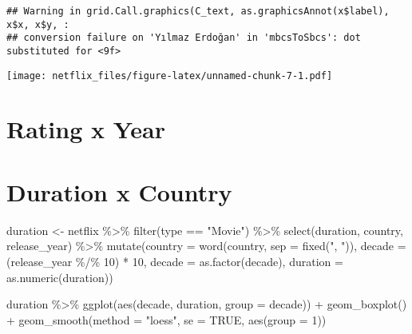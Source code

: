 \documentclass[
]{article}
\newenvironment{Shaded}{\begin{snugshade}}{\end{snugshade}}
\newcommand{\AttributeTok}[1]{\textcolor[rgb]{0.77,0.63,0.00}{#1}}
\newcommand{\ConstantTok}[1]{\textcolor[rgb]{0.00,0.00,0.00}{#1}}
\newcommand{\DecValTok}[1]{\textcolor[rgb]{0.00,0.00,0.81}{#1}}
\newcommand{\FunctionTok}[1]{\textcolor[rgb]{0.00,0.00,0.00}{#1}}
\newcommand{\NormalTok}[1]{#1}
\newcommand{\OtherTok}[1]{\textcolor[rgb]{0.56,0.35,0.01}{#1}}
\newcommand{\SpecialCharTok}[1]{\textcolor[rgb]{0.00,0.00,0.00}{#1}}
\newcommand{\StringTok}[1]{\textcolor[rgb]{0.31,0.60,0.02}{#1}}
\begin{document}
\begin{verbatim}
## Warning in grid.Call.graphics(C_text, as.graphicsAnnot(x$label), x$x, x$y, :
## conversion failure on 'Yılmaz Erdoğan' in 'mbcsToSbcs': dot substituted for <9f>
\end{verbatim}

\texttt{[image: netflix\_files/figure-latex/unnamed-chunk-7-1.pdf]}

\hypertarget{rating-x-year}{%
\section{Rating x Year}\label{rating-x-year}}

\hypertarget{duration-x-country}{%
\section{Duration x Country}\label{duration-x-country}}

\begin{Shaded}
\begin{Highlighting}[]
\NormalTok{duration }\OtherTok{\textless{}{-}}\NormalTok{ netflix }\SpecialCharTok{\%\textgreater{}\%} 
  \FunctionTok{filter}\NormalTok{(type }\SpecialCharTok{==} \StringTok{"Movie"}\NormalTok{) }\SpecialCharTok{\%\textgreater{}\%} 
  \FunctionTok{select}\NormalTok{(duration, country, release\_year) }\SpecialCharTok{\%\textgreater{}\%} 
  \FunctionTok{mutate}\NormalTok{(}\AttributeTok{country =} \FunctionTok{word}\NormalTok{(country, }\AttributeTok{sep =} \FunctionTok{fixed}\NormalTok{(}\StringTok{", "}\NormalTok{)),}
         \AttributeTok{decade =}\NormalTok{ (release\_year }\SpecialCharTok{\%/\%} \DecValTok{10}\NormalTok{) }\SpecialCharTok{*} \DecValTok{10}\NormalTok{,}
         \AttributeTok{decade =} \FunctionTok{as.factor}\NormalTok{(decade),}
         \AttributeTok{duration =} \FunctionTok{as.numeric}\NormalTok{(duration))}
         

\NormalTok{duration }\SpecialCharTok{\%\textgreater{}\%} 
  \FunctionTok{ggplot}\NormalTok{(}\FunctionTok{aes}\NormalTok{(decade, duration, }\AttributeTok{group =}\NormalTok{ decade)) }\SpecialCharTok{+}
  \FunctionTok{geom\_boxplot}\NormalTok{() }\SpecialCharTok{+}
  \FunctionTok{geom\_smooth}\NormalTok{(}\AttributeTok{method =} \StringTok{"loess"}\NormalTok{, }\AttributeTok{se =} \ConstantTok{TRUE}\NormalTok{, }\FunctionTok{aes}\NormalTok{(}\AttributeTok{group =} \DecValTok{1}\NormalTok{)) }
\end{Highlighting}
\end{Shaded}
\end{document}
